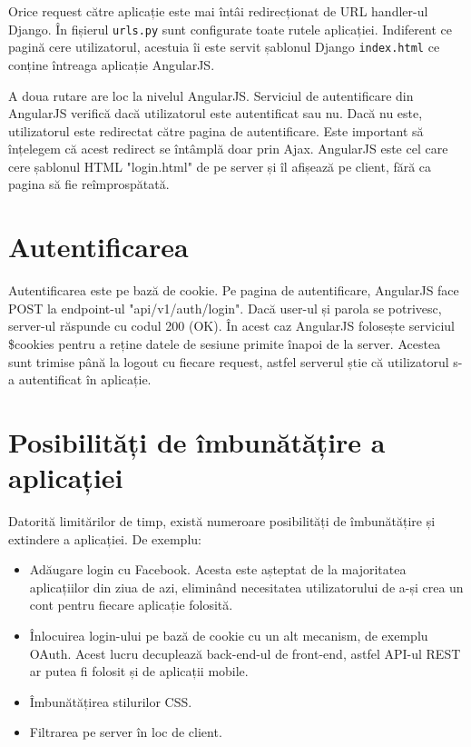 Orice request către aplicație este mai întâi redirecționat
de URL handler-ul Django. În fișierul \texttt{urls.py} sunt
configurate toate rutele aplicației. Indiferent ce pagină
cere utilizatorul, acestuia îi este servit șablonul Django
\texttt{index.html} ce conține întreaga aplicație AngularJS.

A doua rutare are loc la nivelul AngularJS. Serviciul de autentificare
din AngularJS verifică dacă utilizatorul este autentificat sau nu.
Dacă nu este, utilizatorul este redirectat către pagina de autentificare.
Este important să înțelegem că acest redirect se întâmplă
doar prin Ajax. AngularJS este cel care cere șablonul HTML
"login.html" de pe server și îl afișează pe client, fără ca pagina
să fie reîmprospătată.

\section{Autentificarea}

Autentificarea este pe bază de cookie. Pe pagina de autentificare,
AngularJS face POST la endpoint-ul "api/v1/auth/login". Dacă
user-ul și parola se potrivesc, server-ul răspunde cu codul 200 (OK).
În acest caz AngularJS folosește serviciul \$cookies pentru a reține
datele de sesiune primite înapoi de la server. Acestea sunt trimise
până la logout cu fiecare request, astfel serverul știe
că utilizatorul s-a autentificat în aplicație.

\section{Posibilități de îmbunătățire a aplicației}

Datorită limitărilor de timp, există numeroare posibilități de 
îmbunătățire și extindere a aplicației. De exemplu:
\begin{itemize}
\item Adăugare login cu Facebook. Acesta este așteptat de la
majoritatea aplicațiilor din ziua de azi, eliminând necesitatea
utilizatorului de a-și crea un cont pentru fiecare aplicație folosită.
\item Înlocuirea login-ului pe bază de cookie cu un alt mecanism,
de exemplu OAuth. Acest lucru decuplează back-end-ul de front-end, 
astfel API-ul REST ar putea fi folosit
și de aplicații mobile.
\item Îmbunătățirea stilurilor CSS.
\item Filtrarea pe server în loc de client.
\end{itemize}
